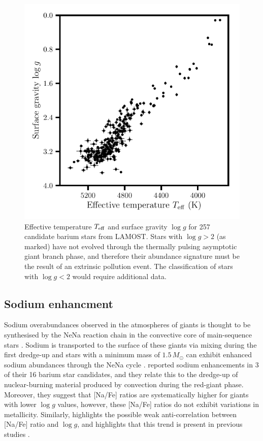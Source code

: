 \documentclass[a4paper,fleqn,usenatbib]{mnras}
\begin{document}
\begin{figure}
	\includegraphics[width=\columnwidth]{hrd_new.pdf}
    \caption{Effective temperature $T_{\rm eff}$ and surface gravity $\log{g}$ for 257 candidate barium stars from LAMOST. Stars with $\log{g} > 2$ (as marked) have not evolved through the thermally pulsing asymptotic giant branch phase, and therefore their abundance signature must be the result of an extrinsic pollution event. The classification of stars with $\log{g} < 2$ would require additional data.}
    \label{fig:figure2}
\end{figure}

\subsection{Sodium enhancment}
Sodium overabundances observed in the atmospheres of giants is thought to be synthesised by the NeNa reaction chain in the convective core of main-sequence stars \citep{el1995}. Sodium is transported to the surface of these giants via mixing during the first dredge-up and stars with a  minimum mass of $1.5\,M_\odot$ can exhibit enhanced sodium abundances through the NeNa cycle \citep{denissenkov1987,smiljanic2012}. \citet{antipova2004} reported sodium enhancements in 3 of their 16 barium star candidates, and they relate this to the dredge-up of nuclear-burning material produced by convection during the red-giant phase. Moreover, they suggest that [Na/Fe] ratios are systematically higher for giants with lower $\log{g}$ values, however, these [Na/Fe] ratios do not exhibit variations in metallicity. Similarly, \citet{decastro2016} highlights the possible weak anti-correlation between [Na/Fe] ratio and $\log{g}$, and highlights that this trend is present in previous studies \citep[e.g.,][]{boyarchuk2002,mishenina2006,luck2007,takeda2008}.
\end{document}
